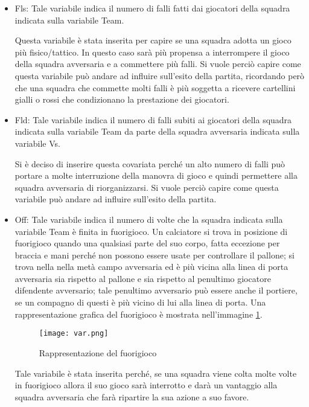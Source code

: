 \begin{itemize}
	\item \textsf{Fls}: Tale variabile indica il numero di falli fatti dai giocatori della squadra indicata sulla variabile \textsf{Team}. 
	
	Questa variabile è stata inserita per capire se una squadra adotta un gioco più fisico/tattico. In questo caso sarà più propensa a interrompere il gioco della squadra avversaria e a commettere più falli. Si vuole perciò capire come questa variabile può andare ad influire sull'esito della partita, ricordando però che una squadra che commette molti falli è più soggetta a ricevere cartellini gialli o rossi che condizionano la prestazione dei giocatori.
	\item \textsf{Fld}: Tale variabile indica il numero di falli subiti ai giocatori della squadra indicata sulla variabile \textsf{Team} da parte della squadra avversaria indicata sulla variabile \textsf{Vs}. 
	
	Si è deciso di inserire questa covariata perché un alto numero di falli può portare a molte interruzione della manovra di gioco e quindi permettere alla squadra avversaria di riorganizzarsi. Si vuole perciò capire come questa variabile può andare ad influire sull'esito della partita.
	\item \textsf{Off}: Tale variabile indica il numero di volte che la squadra indicata sulla variabile \textsf{Team} è finita in fuorigioco. Un calciatore si trova in posizione di fuorigioco quando una qualsiasi parte del suo corpo, fatta eccezione per braccia e mani perché non possono essere usate per controllare il pallone; si trova nella nella metà campo avversaria ed è più vicina alla linea di porta avversaria sia rispetto al pallone e sia rispetto al penultimo giocatore difendente avversario; tale penultimo avversario può essere anche il portiere, se un compagno di questi è più vicino di lui alla linea di porta. Una rappresentazione grafica del fuorigioco è mostrata nell'immagine \ref{fig:offside}.
	
	\begin{figure}[!ht]
		\begin{center}
			\texttt{[image: var.png]}
			
			\caption{Rappresentazione del fuorigioco} \label{fig:offside}
		\end{center}
	\end{figure}
	
	Tale variabile è stata inserita perché, se una squadra viene colta molte volte in fuorigioco allora il suo gioco sarà interrotto e darà un vantaggio alla squadra avversaria che farà ripartire la sua azione a suo favore.
	
\end{itemize}
\pagebreak
